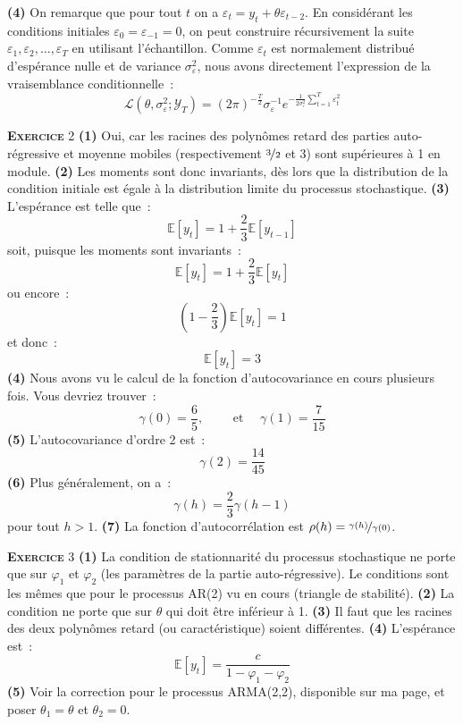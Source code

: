 \documentclass[10pt,a4paper,notitlepage]{article}
\newcommand{\exercice}[1]{\textsc{\textbf{Exercice}} #1}
\newcommand{\question}[1]{\textbf{(#1)}}
\begin{document}
\textbf{(4)} On remarque que pour tout $t$ on a
$\varepsilon_t = y_t + \theta\varepsilon_{t-2}$. En considérant les
conditions initiales $\varepsilon_{0}=\varepsilon_{-1}=0$, on peut
construire récursivement la suite
$\varepsilon_1, \varepsilon_2, \dots, \varepsilon_{T}$ en utilisant
l'échantillon. Comme $\varepsilon_{t}$ est normalement distribué
d'espérance nulle et de variance $\sigma_{\varepsilon}^2$, nous avons directement l'expression de la vraisemblance conditionnelle :
\[
\mathcal L(\theta, \sigma_{\varepsilon}^2; \mathcal Y_T) = (2\pi)^{-\frac{T}{2}}\sigma_{\varepsilon}^{-1}e^{-\frac{1}{2\sigma_{\varepsilon}^2}\sum_{t=1}^T\varepsilon_t^2} 
\]

\bigskip
\bigskip

\exercice{2} \question{1} Oui, car les racines des polynômes retard
des parties auto-régressive et moyenne mobiles (respectivement
$\nicefrac{3}{2}$ et 3) sont supérieures à 1 en module. \question{2}
Les moments sont donc invariants, dès lors que la distribution de la
condition initiale est égale à la distribution limite du processus
stochastique. \question{3} L'espérance est telle que :
\[
\mathbb E [y_t] = 1 + \frac{2}{3}\mathbb E [y_{t-1}]
\]
soit, puisque les moments sont invariants :
\[
\mathbb E [y_t] = 1 + \frac{2}{3}\mathbb E [y_{t}]
\]
ou encore :
\[
\left(1-\frac{2}{3}\right)\mathbb E [y_t] = 1
\]
et donc :
\[
\mathbb E [y_t] = 3
\]
\question{4} Nous avons vu le calcul de la fonction d'autocovariance
en cours plusieurs fois. Vous devriez trouver :
\[
\gamma(0) = \frac{6}{5}, \quad\quad \text{ et }\quad \gamma(1) = \frac{7}{15}
\]
\question{5} L'autocovariance d'ordre 2 est :
\[
\gamma(2) = \frac{14}{45}
\]
\question{6} Plus généralement, on a :
\[
\gamma(h) = \frac{2}{3}\gamma(h-1)
\]
pour tout $h>1$. \question{7} La fonction d'autocorrélation est
$\rho(h) = \nicefrac{\gamma(h)}{\gamma(0)}$.

\bigskip
\bigskip

\exercice{3} \textbf{(1)} La condition de stationnarité du processus stochastique ne porte que sur $\varphi_1$ et $\varphi_2$ (les paramètres de la partie auto-régressive). Le conditions sont les mêmes que pour le processus AR(2) vu en cours (triangle de stabilité). \textbf{(2)} La condition ne porte que sur $\theta$ qui doit être inférieur à 1. \textbf{(3)} Il faut que les racines des deux polynômes retard (ou caractéristique) soient différentes. \textbf{(4)} L'espérance est :
\[
  \mathbb E [y_t] = \frac{c}{1-\varphi_1-\varphi_2}
\]
\textbf{(5)} Voir la correction pour le processus ARMA(2,2), disponible sur ma page, et poser $\theta_1 = \theta$ et $\theta_2=0$.
\end{document}
